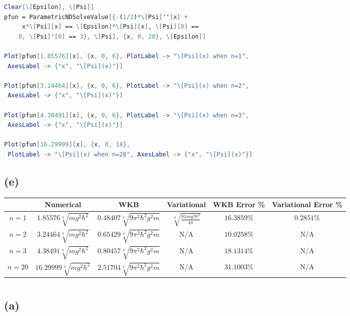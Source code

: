 \documentclass[12pt]{article}
\begin{document}
\begin{spacing}{2.0}
\begin{lstlisting}[language=Mathematica,breaklines=true,frame=single]
Clear[\[Epsilon], \[Psi]]
pfun = ParametricNDSolveValue[{-(1/2)*\[Psi]''[x] +
     x*\[Psi][x] == \[Epsilon]*\[Psi][x], \[Psi][0] ==
    0, \[Psi]'[0] == 3}, \[Psi], {x, 0, 20}, \[Epsilon]]
    
Plot[pfun[1.85576][x], {x, 0, 6}, PlotLabel -> "\[Psi](x) when n=1",
 AxesLabel -> {"x", "\[Psi](x)"}]
 
Plot[pfun[3.24464][x], {x, 0, 6}, PlotLabel -> "\[Psi](x) when n=2",
 AxesLabel -> {"x", "\[Psi](x)"}]
 
Plot[pfun[4.38491][x], {x, 0, 6}, PlotLabel -> "\[Psi](x) when n=3",
 AxesLabel -> {"x", "\[Psi](x)"}]

Plot[pfun[16.29999][x], {x, 0, 18},
 PlotLabel -> "\[Psi](x) when n=20", AxesLabel -> {"x", "\[Psi](x)"}]
\end{lstlisting}

\subsection*{(e)}

\begin{tabular}{|c|c|c|c|c|c|}
  \hline
   & Numerical & WKB & Variational & WKB Error \% & Variational Error \%\\
   \hline
  $n=1$ & $1.85576 \sqrt[3]{mg^2 \hbar^2}$ & $0.48407 \sqrt[3]{9\pi^2 \hbar^2 g^2 m}$ & $\sqrt[3]{\frac{81mg^2\hbar^2}{4\pi}}$ & $16.3859 \%$ & $0.2851 \%$\\
  \hline
  $n=2$ & $3.24464 \sqrt[3]{mg^2 \hbar^2}$ & $0.65429\sqrt[3]{9\pi^2 \hbar^2 g^2 m}$ & N/A & $10.0258 \%$ & N/A \\
  \hline
  $n=3$ & $4.38491 \sqrt[3]{mg^2 \hbar^2}$ & $0.80457\sqrt[3]{9\pi^2 \hbar^2 g^2 m}$ & N/A & $18.1314 \%$ &N/A \\
  \hline
  $n=20$ & $16.29999 \sqrt[3]{mg^2 \hbar^2}$ & $2.51704\sqrt[3]{9\pi^2 \hbar^2 g^2 m}$ & N/A & $31.1003 \%$ &N/A \\
  \hline
\end{tabular}

\section{} %

\subsection*{(a)}


\end{spacing}
\end{document}

